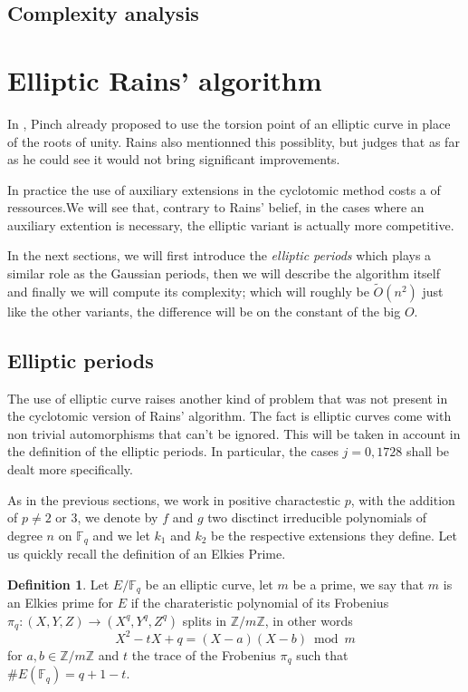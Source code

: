 \documentclass[12pt]{article}
\theoremstyle{plain}
\theoremstyle{definition}
\newtheorem{definition}[theorem]{Definition}
\newcommand{\tildO}{\tilde{O}}
\def\Z{\ensuremath{\mathbb{Z}}}
\def\F{\ensuremath{\mathbb{F}}}
\newcounter{algorithm}
\begin{document}
\subsection{Complexity analysis}



\section{Elliptic Rains' algorithm}

In \cite{}, Pinch already proposed to use the torsion point of an elliptic
curve in place of the roots of unity. Rains also mentionned this possiblity, 
but judges that as far as he could see it would not bring significant 
improvements.\par 
In practice the use of auxiliary extensions in the cyclotomic method costs a of
ressources.We will see that, contrary to Rains' belief, in the cases where an
auxiliary extention is necessary, the elliptic variant is actually more 
competitive.\par
In the next sections, we will first introduce the \emph{elliptic periods} which 
plays a similar role as the Gaussian periods, then we will describe the
algorithm itself and finally we will compute its complexity; which will
roughly be $\tildO(n^2)$ just like the other variants, the difference will be 
on the constant of the big $O$.

\subsection{Elliptic periods}

The use of elliptic curve raises another kind of problem that was not present 
in the cyclotomic version of Rains' algorithm. The fact is elliptic curves 
come with non trivial automorphisms that can't be ignored. This will be taken 
in account in the definition of the elliptic periods. In particular, the cases 
$j = 0, 1728$ shall be dealt more specifically.\par
As in the
previous sections, we work in positive charactestic $p$, with the addition of
$p \neq 2$ or $3$, we denote by $f$ and $g$ two disctinct irreducible
polynomials of degree $n$ on $\F_q$ and we let $k_1$ and $k_2$ be the
respective extensions they define. Let us quickly recall the definition of an 
Elkies Prime. 

\begin{definition}
Let $E/\F_q$ be an elliptic curve, let $m$ be a prime, we say that $m$
is an Elkies prime for $E$ if the charateristic polynomial of its Frobenius
$\pi_q : (X, Y, Z) \to (X^q, Y^q, Z^q)$ splits in $\Z/m\Z$, in other words
\begin{equation}
X^2 - tX + q = (X - a)(X - b) \bmod m
\end{equation}
for $a,b\in\Z/m\Z$ and $t$ the trace of the Frobenius $\pi_q$ such that 
$\# E(\F_q) = q + 1 - t$.
\end{definition}
\end{document}
